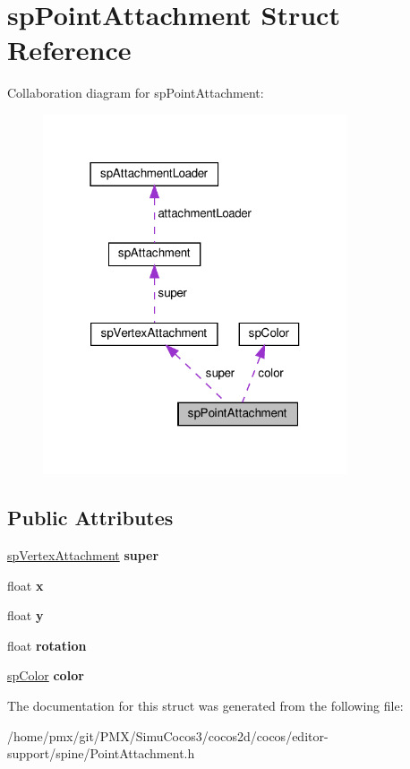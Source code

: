 \hypertarget{structspPointAttachment}{}\section{sp\+Point\+Attachment Struct Reference}
\label{structspPointAttachment}


Collaboration diagram for sp\+Point\+Attachment\+:
\nopagebreak
\begin{figure}[H]
\begin{center}
\leavevmode
\includegraphics[width=255pt]{structspPointAttachment__coll__graph}
\end{center}
\end{figure}
\subsection*{Public Attributes}
\begin{DoxyCompactItemize}
\item 
\mbox{\label{structspPointAttachment_a2cdb2e21c49308ef3ec38613065951eb}} 
\hyperlink{structspVertexAttachment}{sp\+Vertex\+Attachment} {\bfseries super}
\item 
\mbox{\label{structspPointAttachment_a049d776e5ae77c330a7b38dc27bf24e1}} 
float {\bfseries x}
\item 
\mbox{\label{structspPointAttachment_aa654ce5459262359d0d6b38551170d17}} 
float {\bfseries y}
\item 
\mbox{\label{structspPointAttachment_a487c226469b809d540fb1fb8cbca3510}} 
float {\bfseries rotation}
\item 
\mbox{\label{structspPointAttachment_a74ad014521ec04bca89b79d4bf06372a}} 
\hyperlink{structspColor}{sp\+Color} {\bfseries color}
\end{DoxyCompactItemize}


The documentation for this struct was generated from the following file\+:\begin{DoxyCompactItemize}
\item 
/home/pmx/git/\+P\+M\+X/\+Simu\+Cocos3/cocos2d/cocos/editor-\/support/spine/Point\+Attachment.\+h\end{DoxyCompactItemize}
